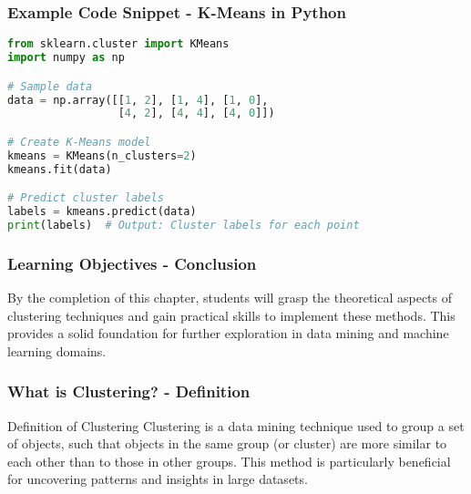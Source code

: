 \documentclass[aspectratio=169]{beamer}
\begin{document}
\begin{frame}[fragile]
    \frametitle{Example Code Snippet - K-Means in Python}
    \begin{lstlisting}[language=Python]
from sklearn.cluster import KMeans
import numpy as np

# Sample data
data = np.array([[1, 2], [1, 4], [1, 0],
                 [4, 2], [4, 4], [4, 0]])

# Create K-Means model
kmeans = KMeans(n_clusters=2)
kmeans.fit(data)

# Predict cluster labels
labels = kmeans.predict(data)
print(labels)  # Output: Cluster labels for each point
    \end{lstlisting}
\end{frame}

\begin{frame}[fragile]
    \frametitle{Learning Objectives - Conclusion}
    By the completion of this chapter, students will grasp the theoretical aspects of clustering techniques and gain practical skills to implement these methods. This provides a solid foundation for further exploration in data mining and machine learning domains.
\end{frame}

\begin{frame}[fragile]
    \frametitle{What is Clustering? - Definition}
    \begin{block}{Definition of Clustering}
        Clustering is a data mining technique used to group a set of objects, such that objects in the same group (or cluster) are more similar to each other than to those in other groups. This method is particularly beneficial for uncovering patterns and insights in large datasets.
    \end{block}
\end{frame}
\end{document}
